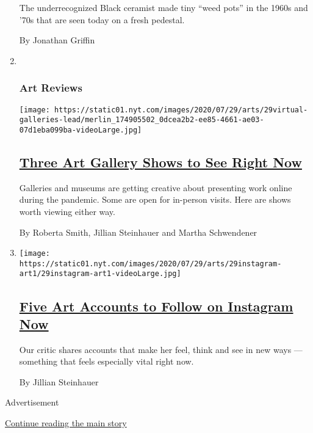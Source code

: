 \begin{enumerate}
  The underrecognized Black ceramist made tiny ``weed pots'' in the
  1960s and '70s that are seen today on a fresh pedestal.

  By Jonathan Griffin
\item ~
  \hypertarget{art-reviews}{%
  \subsubsection{Art Reviews}\label{art-reviews}}

  \texttt{[image: https://static01.nyt.com/images/2020/07/29/arts/29virtual-galleries-lead/merlin\_174905502\_0dcea2b2-ee85-4661-ae03-07d1eba099ba-videoLarge.jpg]}

  \hypertarget{three-art-gallery-shows-to-see-right-now}{%
  \subsection{\texorpdfstring{\href{/2020/07/30/arts/design/virtual-art-gallery-shows.html}{Three
  Art Gallery Shows to See Right
  Now}}{Three Art Gallery Shows to See Right Now}}\label{three-art-gallery-shows-to-see-right-now}}

  Galleries and museums are getting creative about presenting work
  online during the pandemic. Some are open for in-person visits. Here
  are shows worth viewing either way.

  By Roberta Smith, Jillian Steinhauer and Martha Schwendener
\item
  \texttt{[image: https://static01.nyt.com/images/2020/07/29/arts/29instagram-art1/29instagram-art1-videoLarge.jpg]}

  \hypertarget{five-art-accounts-to-follow-on-instagram-now}{%
  \subsection{\texorpdfstring{\href{/2020/07/29/arts/design/art-accounts-to-follow-instagram.html}{Five
  Art Accounts to Follow on Instagram
  Now}}{Five Art Accounts to Follow on Instagram Now}}\label{five-art-accounts-to-follow-on-instagram-now}}

  Our critic shares accounts that make her feel, think and see in new
  ways --- something that feels especially vital right now.

  By Jillian Steinhauer
\end{enumerate}

Advertisement

\protect\hyperlink{after-mid1}{Continue reading the main story}

